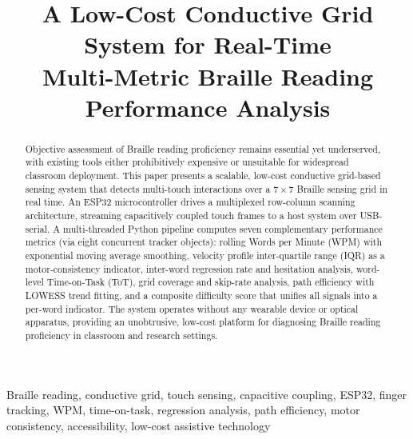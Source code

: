 \documentclass[conference]{IEEEtran}
\begin{document}
\setlength{\textfloatsep}{3pt plus 1pt minus 2pt}
\setlength{\floatsep}{3pt plus 1pt minus 2pt}
\setlength{\intextsep}{3pt plus 1pt minus 2pt}
\setlength{\abovecaptionskip}{1pt}
\setlength{\belowcaptionskip}{-3pt}
\setlength{\parskip}{0pt}
\setlength{\abovecaptionskip}{3pt}
\setlength{\belowcaptionskip}{-2pt}

    \title{A Low-Cost Conductive Grid System for Real-Time\\
    Multi-Metric Braille Reading Performance Analysis}

    \maketitle

    \begin{abstract}
    Objective assessment of Braille reading proficiency remains essential
    yet underserved, with existing tools either prohibitively expensive or
    unsuitable for widespread classroom deployment. This paper presents a
    scalable, low-cost conductive grid-based sensing system that detects
    multi-touch interactions over a $7\times7$ Braille sensing grid in
    real time. An ESP32 microcontroller drives a multiplexed row-column
    scanning architecture, streaming capacitively coupled touch frames to
    a host system over USB-serial. A multi-threaded Python pipeline
    computes seven complementary performance metrics (via eight concurrent tracker objects): rolling Words per
    Minute (WPM) with exponential moving average smoothing, velocity
    profile inter-quartile range (IQR) as a motor-consistency indicator,
    inter-word regression rate and hesitation analysis, word-level
    Time-on-Task (ToT), grid coverage and skip-rate analysis, path
    efficiency with LOWESS trend fitting, and a composite difficulty score
    that unifies all signals into a per-word indicator. The system
    operates without any wearable device or optical apparatus, providing
    an unobtrusive, low-cost platform for diagnosing Braille reading
    proficiency in classroom and research settings.
    \end{abstract}

    \begin{IEEEkeywords}
    Braille reading, conductive grid, touch sensing, capacitive coupling,
    ESP32, finger tracking, WPM, time-on-task, regression analysis, path
    efficiency, motor consistency, accessibility, low-cost assistive
    technology
    \end{IEEEkeywords}
\end{document}
